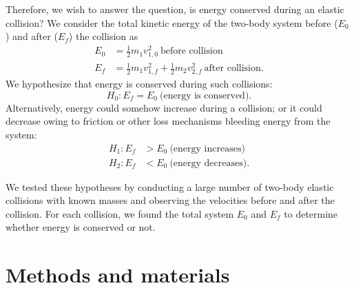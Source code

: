 \documentclass[aps,prl,preprint]{revtex4-1}
\begin{document}
Therefore, we wish to answer the question, is energy conserved during an elastic collision? We consider the total kinetic energy of the two-body system before ($E_0$) and after ($E_f$) the collision as
\begin{align}
E_0 &= \frac{1}{2} m_1 v_{1,0}^2\ \text{before collision}\\
E_f &= \frac{1}{2} m_1 v_{1,f}^2 + \frac{1}{2} m_2 v_{2,f}^2\ \text{after collision}.
\end{align}
We hypothesize that energy is conserved during such collisions:
\begin{equation}
H_0: E_f = E_0\ \text{(energy is conserved)}.
\end{equation}
Alternatively, energy could somehow increase during a collision; or it could decrease owing to friction or other loss mechanisms bleeding energy from the system: 
\begin{align}
H_1: E_f &> E_0\ \text{(energy increases)} \\
H_2: E_f &< E_0\ \text{(energy decreases)} .
\end{align}

We tested these hypotheses by conducting a large number of two-body elastic collisions with known masses and observing the velocities before and after the collision. For each collision, we found the total system $E_0$ and $E_f$ to determine whether energy is conserved or not. 

\section{Methods and materials}
\end{document}
